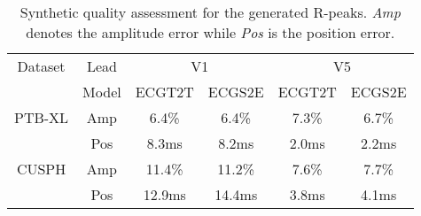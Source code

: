


\begin{table}
  \caption{Synthetic quality assessment for the generated R-peaks. \textit{Amp} denotes the amplitude error while \textit{Pos} is the position error.}
  \label{tab:gen_qual}
  \begin{tabular}{cccccc}
    \toprule
    
        {Dataset} & Lead & \multicolumn{2}{c}{V1} & \multicolumn{2}{c}{V5} \\
                            \cmidrule{2-6}
                            & Model & ECGT2T & ECGS2E & ECGT2T & ECGS2E \\ 
        \midrule
        {PTB-XL} & Amp    & 6.4\%      & 6.4\%     &         7.3\%             &      6.7\%                  \\
                                & Pos     & 8.3ms      & 8.2ms     &        2.0ms   &  2.2ms                    \\ 
        \midrule
        {CUSPH}  & Amp    & 11.4\%      & 11.2\%     &     7.6\%&   7.7\%                   \\
                                & Pos     & 12.9ms      & 14.4ms     & 3.8ms   &  4.1ms \\

  \bottomrule
\end{tabular}
\end{table}


